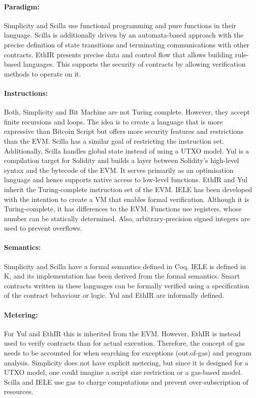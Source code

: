 \documentclass{llncs}
\begin{document}
\paragraph{Paradigm:} Simplicity and Scilla use functional programming and pure functions in their language. Scilla is additionally driven by an automata-based approach with the precise definition of state transitions and terminating communications with other contracts.
EthIR presents precise data and control flow that allows building rule-based languages. This supports the security of contracts by allowing verification methods to operate on it.


\paragraph{Instructions:} Both, Simplicity and Bit Machine are not Turing complete. However, they accept finite recursions and loops. The idea is to create a language that is more expressive than Bitcoin Script but offers more security features and restrictions than the EVM. Scilla has a similar goal of restricting the instruction set. Additionally, Scilla handles global state instead of using a UTXO model.
Yul is a compilation target for Solidity and builds a layer between Solidity's high-level syntax and the bytecode of the EVM. It serves primarily as an optimisation language and hence supports native access to low-level functions.
EthIR and Yul inherit the Turing-complete instruction set of the EVM.
IELE has been developed with the intention to create a VM that enables formal verification. Although it is Turing-complete, it has differences to the EVM. Functions use registers, whose number can be statically determined. Also, arbitrary-precision signed integers are used to prevent overflows.

\paragraph{Semantics:} Simplicity and Scilla have a formal semantics defined in Coq. IELE is defined in K, and its implementation has been derived from the formal semantics. Smart contracts written in these languages can be formally verified using a specification of the contract behaviour or logic. Yul and EthIR are informally defined.

\paragraph{Metering:} For Yul and EthIR this is inherited from the EVM. However, EthIR is instead used to verify contracts than for actual execution. Therefore, the concept of gas needs to be accounted for when searching for exceptions (out.of-gas) and program analysis. Simplicity does not have explicit metering, but since it is designed for a UTXO model, one could imagine a script size restriction or a gas-based model.
Scilla and IELE use gas to charge computations and prevent over-subscription of resources.
\end{document}
